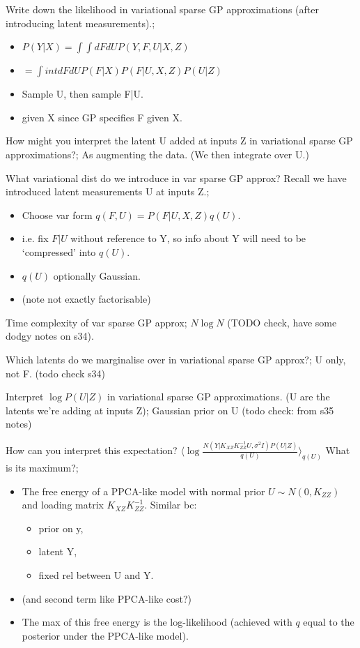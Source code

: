 \documentclass{article}
\begin{document}
Write down the likelihood in variational sparse GP approximations (after introducing latent measurements).; \begin{itemize} \item $P(Y|X)=\int \int dFdU P(Y, F, U|X, Z)$ \item $=\int int dFdU P(F|X)P(F|U, X, Z)P(U|Z)$ \item Sample U, then sample F|U. \item given X since GP specifies F given X. \end{itemize}

How might you interpret the latent U added at inputs Z in variational sparse GP approximations?; As augmenting the data. (We then integrate over U.)

What variational dist do we introduce in var sparse GP approx? Recall we have introduced latent measurements U at inputs Z.; \begin{itemize} \item Choose var form $q(F, U)=P(F|U, X, Z)q(U)$.  \item i.e. fix $F|U$ without reference to Y, so info about Y will need to be `compressed' into $q(U)$. \item $q(U)$ optionally Gaussian. \item (note not exactly factorisable) \end{itemize}

Time complexity of var sparse GP approx; $N\log N$ (TODO check, have some dodgy notes on s34).

Which latents do we marginalise over in variational sparse GP approx?; U only, not F. (todo check s34)

Interpret $\log P(U|Z)$ in variational sparse GP approximations. (U are the latents we're adding at inputs Z); Gaussian prior on U (todo check: from s35 notes)

How can you interpret this expectation? $\langle \log \frac{N(Y|K_{XZ}K_{ZZ}^{-1}U, \sigma^2I)P(U|Z)}{q(U)}\rangle_{q(U)}$ What is its maximum?; \begin{itemize} \item The free energy of a PPCA-like model with normal prior $U\sim N(0, K_{ZZ})$ and loading matrix $K_{XZ}K_{ZZ}^{-1}$. Similar bc: \begin{itemize} \item prior on y, \item latent Y, \item fixed rel between U and Y. \end{itemize} \item (and second term like PPCA-like cost?) \item The max of this free energy is the log-likelihood (achieved with $q$ equal to the posterior under the PPCA-like model). \end{itemize}
\end{document}
